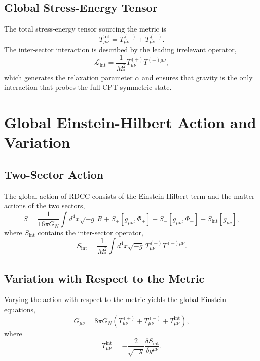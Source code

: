 \documentclass[11pt,a4paper]{article}
\begin{document}
\subsection{Global Stress-Energy Tensor}

The total stress-energy tensor sourcing the metric is
\begin{equation}
T_{\mu\nu}^{\mathrm{tot}} = T_{\mu\nu}^{(+)} + T_{\mu\nu}^{(-)}.
\end{equation}
The inter-sector interaction is described by the leading irrelevant operator,
\begin{equation}
\mathcal{L}_{\mathrm{int}} = \frac{1}{M_*^2} T^{(+)}_{\mu\nu} T^{(-)\mu\nu},
\end{equation}
which generates the relaxation parameter $\alpha$ and ensures that gravity is the only interaction that probes the full CPT-symmetric state.

\section{Global Einstein-Hilbert Action and Variation}

\subsection{Two-Sector Action}

The global action of RDCC consists of the Einstein-Hilbert term and the matter actions of the two sectors,
\begin{equation}
S = \frac{1}{16\pi G_N} \int d^4x \sqrt{-g} \, R 
+ S_+[g_{\mu\nu}, \Phi_+] 
+ S_-[g_{\mu\nu}, \Phi_-]
+ S_{\mathrm{int}}[g_{\mu\nu}],
\end{equation}
where $S_{\mathrm{int}}$ contains the inter-sector operator,
\begin{equation}
S_{\mathrm{int}} = \frac{1}{M_*^2} \int d^4x \sqrt{-g} \, 
T^{(+)}_{\mu\nu} T^{(-)\mu\nu}.
\end{equation}

\subsection{Variation with Respect to the Metric}

Varying the action with respect to the metric yields the global Einstein equations,
\begin{equation}
G_{\mu\nu} = 8\pi G_N \left( T_{\mu\nu}^{(+)} + T_{\mu\nu}^{(-)} + T_{\mu\nu}^{\mathrm{int}} \right),
\end{equation}
where
\begin{equation}
T_{\mu\nu}^{\mathrm{int}} = -\frac{2}{\sqrt{-g}} \frac{\delta S_{\mathrm{int}}}{\delta g^{\mu\nu}}.
\end{equation}
\end{document}
